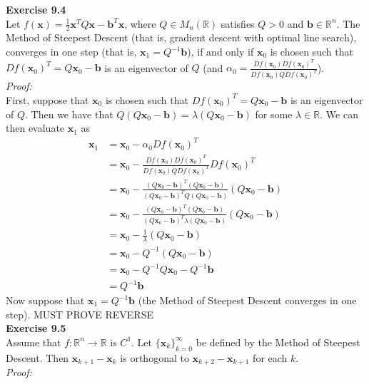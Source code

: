 \documentclass[letterpaper,12pt]{article}
\let\vec\mathbf
\theoremstyle{definition}
\begin{document}
\textbf{Exercise 9.4} \\
Let $f(\vec{x}) = \frac{1}{2}\vec{x}^TQ\vec{x} - \vec{b}^T\vec{x}$, where $Q \in M_n(\mathbb{R})$ satisfies $Q>0$ and $\vec{b} \in \mathbb{R}^n$. The Method of Steepest Descent (that is, gradient descent with optimal line search), converges in one step (that is, $\vec{x}_1 = Q^{-1}\vec{b}$), if and only if $\vec{x}_0$ is chosen such that $Df(\vec{x}_0)^T = Q\vec{x}_0 - \vec{b}$ is an eigenvector of $Q$ \big(and $\alpha_0 = \frac{Df(\vec{x}_0)Df(\vec{x}_0)^T}{Df(\vec{x}_0)QDf(\vec{x}_0)^T}$\big). \\
\textit{Proof:} \\
First, suppose that $\vec{x}_0$ is chosen such that $Df(\vec{x}_0)^T = Q\vec{x}_0 - \vec{b}$ is an eigenvector of $Q$. Then we have that $Q(Q\vec{x}_0 - \vec{b}) = \lambda(Q\vec{x}_0 - \vec{b})$ for some $\lambda \in \mathbb{R}$. We can then evaluate $\vec{x}_1$ as
\begin{align*}
  \vec{x}_1 &= \vec{x}_0 - \alpha_0 Df(\vec{x}_0)^T
  \\
  &= \vec{x}_0 - \frac{Df(\vec{x}_0)Df(\vec{x}_0)^T}{Df(\vec{x}_0)QDf(\vec{x}_0)^T} Df(\vec{x}_0)^T
  \\
  &= \vec{x}_0 - \frac{(Q\vec{x}_0 - \vec{b})^T(Q\vec{x}_0 - \vec{b})}{(Q\vec{x}_0 - \vec{b})^TQ(Q\vec{x}_0 - \vec{b})} (Q\vec{x}_0 - \vec{b})
  \\
  &= \vec{x}_0 - \frac{(Q\vec{x}_0 - \vec{b})^T(Q\vec{x}_0 - \vec{b})}{(Q\vec{x}_0 - \vec{b})^T\lambda(Q\vec{x}_0 - \vec{b})} (Q\vec{x}_0 - \vec{b})
  \\
  &= \vec{x}_0 - \frac{1}{\lambda}(Q\vec{x}_0 - \vec{b})
  \\
  &= \vec{x}_0 - Q^{-1}(Q\vec{x}_0 - \vec{b})
  \\
  &= \vec{x}_0 - Q^{-1}Q\vec{x}_0 - Q^{-1}\vec{b}
  \\
  &= Q^{-1}\vec{b}
\end{align*}
Now suppose that $\vec{x}_1 = Q^{-1}\vec{b}$ (the Method of Steepest Descent converges in one step). MUST PROVE REVERSE \\

\textbf{Exercise 9.5} \\
Assume that $f: \mathbb{R}^n \rightarrow \mathbb{R}$ is $C^1$. Let $\{\vec{x}_k\}_{k=0}^\infty$ be defined by the Method of Steepest Descent. Then $\vec{x}_{k+1} - \vec{x}_k$ is orthogonal to $\vec{x}_{k+2} - \vec{x}_{k+1}$ for each $k$. \\
\textit{Proof:} \\
\end{document}
